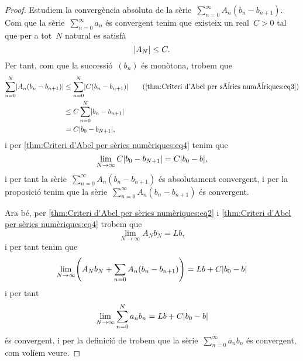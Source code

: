 \documentclass[../../main.tex]{subfiles}
\begin{document}
\begin{theorem}
\begin{proof}
            Estudiem la convergència absoluta de la sèrie~\(\sum_{n=0}^{\infty}A_{n}(b_{n}-b_{n+1})\).
            Com que la sèrie~\(\sum_{n=0}^{\infty}a_{n}\) és convergent tenim que existeix un real~\(C>0\) tal que per a tot~\(N\) natural es satisfà
            \begin{equation}
                \label{thm:Criteri d'Abel per sèries numèriques:eq3}
                \abs{A_{N}}\leq C.
            \end{equation}
            Per tant, com que la successió~\((b_{n})\) és monòtona, trobem que
            \begin{align*}
                \sum_{n=0}^{N}\abs{A_{n}(b_{n}-b_{n+1})}&\leq\sum_{n=0}^{N}\abs{C(b_{n}-b_{n+1})} \tag{\ref{thm:Criteri d'Abel per sèries numèriques:eq3}}\\
                &\leq C\sum_{n=0}^{N}\abs{b_{n}-b_{n+1}} \\
                &=C\abs{b_{0}-b_{N+1}},
            \end{align*}
            i per \eqref{thm:Criteri d'Abel per sèries numèriques:eq4} tenim que
            \[
                \lim_{N\to\infty}C\abs{b_{0}-b_{N+1}}=C\abs{b_{0}-b},
            \]
            i per tant la sèrie~\(\sum_{n=0}^{\infty}A_{n}(b_{n}-b_{n+1})\) és absolutament convergent, %
            i per la proposició  tenim que la sèrie~\(\sum_{n=0}^{\infty}A_{n}(b_{n}-b_{n+1})\) és convergent.

            Ara bé, per \eqref{thm:Criteri d'Abel per sèries numèriques:eq2} i \eqref{thm:Criteri d'Abel per sèries numèriques:eq4} trobem que
            \[
                \lim_{N\to\infty}A_{N}b_{N}=Lb,
            \]
            i per tant tenim que
            \[
                \lim_{N\to\infty}\left(A_{N}b_{N}+\sum_{n=0}A_{n}(b_{n}-b_{n+1})\right)=Lb+C\abs{b_{0}-b}
            \]
            i per tant
            \[
                \lim_{N\to\infty}\sum_{n=0}^{N}a_{n}b_{n}=Lb+C\abs{b_{0}-b}
            \]
            és convergent, i per la definició de  trobem que la sèrie~\(\sum_{n=0}^{\infty}a_{n}b_{n}\) és convergent, com volíem veure.
        \end{proof}
    \end{theorem}
\end{document}
